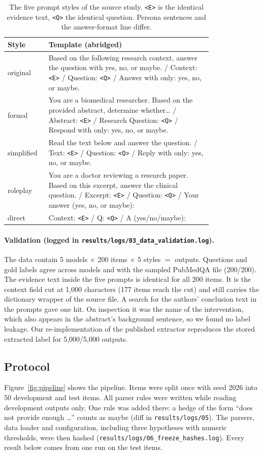 \documentclass[acmsmall]{acmart}
\begin{document}
\begin{table}[t]
\caption{The five prompt styles of the source study. \texttt{<E>} is the identical evidence text, \texttt{<Q>} the identical question. Persona sentences and the answer-format line differ.}\label{tab:prompts}
\small
\begin{tabular}{@{}lL{0.80\linewidth}@{}}
\toprule
Style & Template (abridged) \\
\midrule
original & Based on the following research context, answer the question with yes, no, or maybe. / Context: \texttt{<E>} / Question: \texttt{<Q>} / Answer with only: yes, no, or maybe. \\
formal & You are a biomedical researcher. Based on the provided abstract, determine whether\ldots{} / Abstract: \texttt{<E>} / Research Question: \texttt{<Q>} / Respond with only: yes, no, or maybe. \\
simplified & Read the text below and answer the question. / Text: \texttt{<E>} / Question: \texttt{<Q>} / Reply with only: yes, no, or maybe. \\
roleplay & You are a doctor reviewing a research paper. Based on this excerpt, answer the clinical question. / Excerpt: \texttt{<E>} / Question: \texttt{<Q>} / Your answer (yes, no, or maybe): \\
direct & Context: \texttt{<E>} / Q: \texttt{<Q>} / A (yes/no/maybe): \\
\bottomrule
\end{tabular}
\end{table}

\paragraph{Validation (logged in \texttt{results/logs/03\_data\_validation.log}).} The data contain 5 models $\times$ 200 items $\times$ 5 styles $=$ \NOutAll{} outputs. Questions and gold labels agree across models and with the sampled PubMedQA file (200/200). The evidence text inside the five prompts is identical for all 200 items. It is the context field cut at 1,000 characters (177 items reach the cut) and still carries the dictionary wrapper of the source file. A search for the authors' conclusion text in the prompts gave one hit. On inspection it was the name of the intervention, which also appears in the abstract's background sentence, so we found no label leakage. Our re-implementation of the published extractor reproduces the stored extracted label for 5,000/5,000 outputs.

\subsection{Protocol}\label{sec:protocol}
Figure~\ref{fig:pipeline} shows the pipeline. Items were split once with seed 2026 into 50 development and \NTest{} test items. All parser rules were written while reading development outputs only. One rule was added there: a hedge of the form ``does not provide enough \ldots'' counts as maybe (diff in \texttt{results/logs/05}). The parsers, data loader and configuration, including three hypotheses with numeric thresholds, were then hashed (\texttt{results/logs/06\_freeze\_hashes.log}). Every result below comes from one run on the test items.
\end{document}
